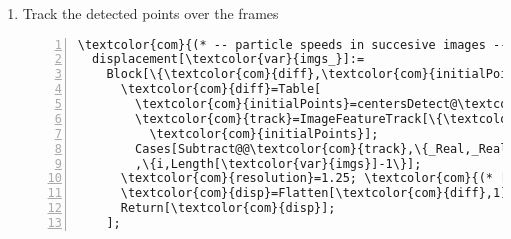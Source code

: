 \begin{enumerate}
  \item Track the detected points over the frames
  \begin{Verbatim}[commandchars=\\\{\}, numbers=left]
  \textcolor{com}{(* -- particle speeds in succesive images -- *)}
  displacement[\textcolor{var}{imgs_}]:=
    Block[\{\textcolor{com}{diff},\textcolor{com}{initialPoints},\textcolor{com}{track},\textcolor{com}{resolution},\textcolor{com}{disp}\},
      \textcolor{com}{diff}=Table[
        \textcolor{com}{initialPoints}=centersDetect@\textcolor{var}{imgs}[[\textcolor{com}{i}]];
        \textcolor{com}{track}=ImageFeatureTrack[\{\textcolor{var}{imgs}[[\textcolor{com}{i}]],\textcolor{var}{imgs}[[\textcolor{com}{i}+1]]\},
          \textcolor{com}{initialPoints}];
        Cases[Subtract@@\textcolor{com}{track},\{_Real,_Real\}]
        ,\{i,Length[\textcolor{var}{imgs}]-1\}];
      \textcolor{com}{resolution}=1.25; \textcolor{com}{(* [um/pixel] *)}
      \textcolor{com}{disp}=Flatten[\textcolor{com}{diff},1]*\textcolor{com}{resolution}; \textcolor{com}{(* in [um/fr] *)}
      Return[\textcolor{com}{disp}];
    ];
  \end{Verbatim}
  
\end{enumerate}



